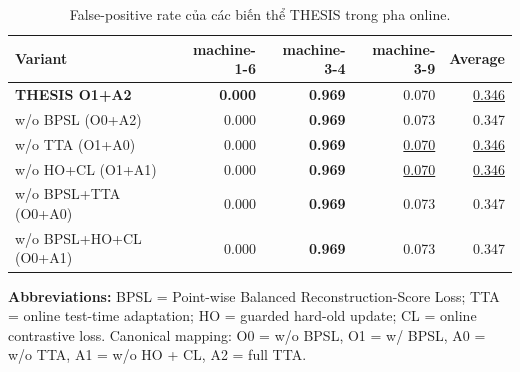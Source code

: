 \begin{table}[htbp]
\centering
\caption{False-positive rate của các biến thể THESIS trong pha online.}
\label{tab:online-thesis-fpr}
\scriptsize
\begin{tabular}{lrrrr}
\toprule
Variant & machine-1-6 & machine-3-4 & machine-3-9 & Average \\
\midrule
\rowcolor{black!10} \textbf{THESIS O1+A2} & \textbf{0.000} & \textbf{0.969} & 0.070 & \underline{0.346} \\
\quad w/o BPSL (O0+A2) & 0.000 & \textbf{0.969} & 0.073 & 0.347 \\
\quad w/o TTA (O1+A0) & 0.000 & \textbf{0.969} & \underline{0.070} & \underline{0.346} \\
\quad w/o HO+CL (O1+A1) & 0.000 & \textbf{0.969} & \underline{0.070} & \underline{0.346} \\
\quad w/o BPSL+TTA (O0+A0) & 0.000 & \textbf{0.969} & 0.073 & 0.347 \\
\quad w/o BPSL+HO+CL (O0+A1) & 0.000 & \textbf{0.969} & 0.073 & 0.347 \\
\bottomrule
\end{tabular}
\end{table}

\textbf{Abbreviations:} BPSL = Point-wise Balanced Reconstruction-Score Loss; TTA = online test-time adaptation; HO = guarded hard-old update; CL = online contrastive loss. Canonical mapping: O0 = w/o BPSL, O1 = w/ BPSL, A0 = w/o TTA, A1 = w/o HO + CL, A2 = full TTA.
